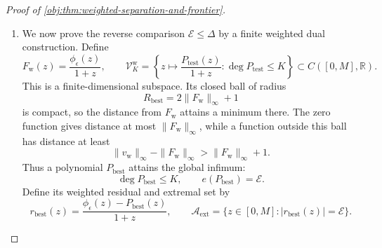 \documentclass[11pt]{article}
\begin{document}
\begin{proof}[Proof of \cref{obj:thm:weighted-separation-and-frontier}]
\begin{enumerate}
\item
We now prove the reverse comparison \(\mathcal E\le\Delta\) by a finite weighted dual construction. Define
\[
F_{\mathrm w}(z)=\frac{\phi_\epsilon(z)}{1+z},
\qquad
\mathcal V_K^{\mathrm w}
=\left\{
z\mapsto\frac{P_{\mathrm{test}}(z)}{1+z}:
\deg P_{\mathrm{test}}\le K
\right\}
\subset C([0,M],\mathbb R).
\]
This is a finite-dimensional subspace. Its closed ball of radius
\[
R_{\mathrm{best}}=2\|F_{\mathrm w}\|_\infty+1
\]
is compact, so the distance from \(F_{\mathrm w}\) attains a minimum there. The zero function gives distance at most \(\|F_{\mathrm w}\|_\infty\), while a function outside this ball has distance at least
\[
\|v_{\mathrm w}\|_\infty-\|F_{\mathrm w}\|_\infty
>\|F_{\mathrm w}\|_\infty+1.
\]
Thus a polynomial \(P_{\mathrm{best}}\) attains the global infimum:
\[
\deg P_{\mathrm{best}}\le K,
\qquad
e(P_{\mathrm{best}})=\mathcal E.
\]
Define its weighted residual and extremal set by
\[
r_{\mathrm{best}}(z)
=\frac{\phi_\epsilon(z)-P_{\mathrm{best}}(z)}{1+z},
\qquad
\mathcal A_{\mathrm{ext}}
=\{z\in[0,M]:|r_{\mathrm{best}}(z)|=\mathcal E\}.
\]


\end{enumerate}
\end{proof}
\end{document}
